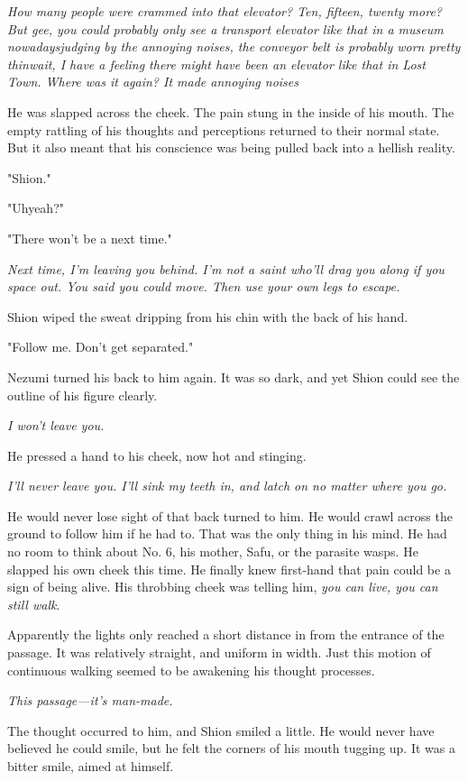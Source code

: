 \emph{How many people were crammed into that elevator? Ten, fifteen, twenty\el 
more? But gee, you could probably only see a transport elevator like
that in a museum nowadays\el judging by the annoying noises, the
conveyor belt is probably worn pretty thin\el wait, I have a feeling
there might have been an elevator like that in Lost Town. Where was it
again? It made annoying noises\el }

He was slapped across the cheek. The pain stung in the inside of his
mouth. The empty rattling of his thoughts and perceptions returned to
their normal state. But it also meant that his conscience was being
pulled back into a hellish reality.

"Shion."

"Uh\el yeah?"

"There won't be a next time."

\emph{Next time, I'm leaving you behind. I'm not a saint who'll drag you along
if you space out. You said you could move. Then use your own legs to
escape.}

Shion wiped the sweat dripping from his chin with the back of his hand.

"Follow me. Don't get separated."

Nezumi turned his back to him again. It was so dark, and yet Shion could
see the outline of his figure clearly.

\emph{I won't leave you.}

He pressed a hand to his cheek, now hot and stinging.

\emph{I'll never leave you. I'll sink my teeth in, and latch on no matter
where you go.}

He would never lose sight of that back turned to him. He would crawl
across the ground to follow him if he had to. That was the only thing in
his mind. He had no room to think about No. 6, his mother, Safu, or the
parasite wasps. He slapped his own cheek this time. He finally knew
first-hand that pain could be a sign of being alive. His throbbing cheek
was telling him, \emph{you can live, you can still walk}.

Apparently the lights only reached a short distance in from the entrance
of the passage. It was relatively straight, and uniform in width. Just
this motion of continuous walking seemed to be awakening his thought
processes.

\emph{This passage---it's man-made.}

The thought occurred to him, and Shion smiled a little. He would never
have believed he could smile, but he felt the corners of his mouth
tugging up. It was a bitter smile, aimed at himself.

